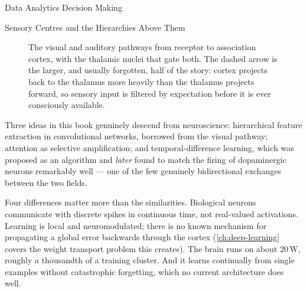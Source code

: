 \begin{v3topic}{Data Analytics Decision Making}
\begin{v3topic}{Sensory Centres and the Hierarchies Above Them}
\begin{figure}[htbp]
\caption{The visual and auditory pathways from receptor to association
cortex, with the thalamic nuclei that gate both. The dashed arrow is the
larger, and usually forgotten, half of the story: cortex projects back to the
thalamus more heavily than the thalamus projects forward, so sensory input is
filtered by expectation before it is ever consciously available.}
\label{fig:intro-sensory-pathways}
\end{figure}

\end{v3topic}

\begin{cautionbox}
Three ideas in this book genuinely descend from neuroscience: hierarchical
feature extraction in convolutional networks, borrowed from the visual
pathway; attention as selective amplification; and temporal-difference
learning, which was proposed as an algorithm and \emph{later} found to match
the firing of dopaminergic neurons remarkably well --- one of the few
genuinely bidirectional exchanges between the two fields.

Four differences matter more than the similarities. Biological neurons
communicate with discrete spikes in continuous time, not real-valued
activations. Learning is local and neuromodulated; there is no known
mechanism for propagating a global error backwards through the cortex
(\cref{ch:deep-learning} covers the weight transport problem this creates).
The brain runs on about $20\,\text{W}$, roughly a thousandth of a training
cluster. And it learns continually from single examples without catastrophic
forgetting, which no current architecture does well.


\end{cautionbox}
\end{v3topic}

